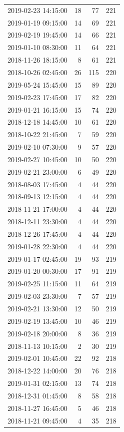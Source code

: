 \begin{tabular}{lrrr}
2019-02-23 14:15:00 & 18 & 77 & 221 \\
2019-01-19 09:15:00 & 14 & 69 & 221 \\
2019-02-19 19:45:00 & 14 & 66 & 221 \\
2019-01-10 08:30:00 & 11 & 64 & 221 \\
2018-11-26 18:15:00 & 8 & 61 & 221 \\
2018-10-26 02:45:00 & 26 & 115 & 220 \\
2019-05-24 15:45:00 & 15 & 89 & 220 \\
2019-02-23 17:45:00 & 17 & 82 & 220 \\
2019-01-21 16:15:00 & 15 & 74 & 220 \\
2018-12-18 14:45:00 & 10 & 61 & 220 \\
2018-10-22 21:45:00 & 7 & 59 & 220 \\
2019-02-10 07:30:00 & 9 & 57 & 220 \\
2019-02-27 10:45:00 & 10 & 50 & 220 \\
2019-02-21 23:00:00 & 6 & 49 & 220 \\
2018-08-03 17:45:00 & 4 & 44 & 220 \\
2018-09-13 12:15:00 & 4 & 44 & 220 \\
2018-11-21 17:00:00 & 4 & 44 & 220 \\
2018-12-11 23:30:00 & 4 & 44 & 220 \\
2018-12-26 17:45:00 & 4 & 44 & 220 \\
2019-01-28 22:30:00 & 4 & 44 & 220 \\
2019-01-17 02:45:00 & 19 & 93 & 219 \\
2019-01-20 00:30:00 & 17 & 91 & 219 \\
2019-02-25 11:15:00 & 11 & 64 & 219 \\
2019-02-03 23:30:00 & 7 & 57 & 219 \\
2019-02-21 13:30:00 & 12 & 50 & 219 \\
2019-02-19 13:45:00 & 10 & 46 & 219 \\
2019-02-18 20:00:00 & 8 & 36 & 219 \\
2018-11-13 10:15:00 & 2 & 30 & 219 \\
2019-02-01 10:45:00 & 22 & 92 & 218 \\
2018-12-22 14:00:00 & 20 & 76 & 218 \\
2019-01-31 02:15:00 & 13 & 74 & 218 \\
2018-12-31 01:45:00 & 8 & 58 & 218 \\
2018-11-27 16:45:00 & 5 & 46 & 218 \\
2018-11-21 09:45:00 & 4 & 35 & 218 \\

\end{tabular}
